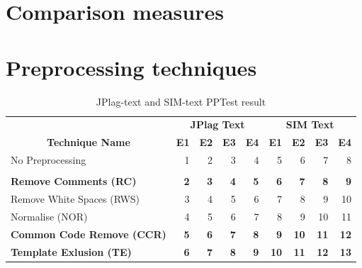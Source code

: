 \documentclass[a4paper, 12pt, oneside, openany, final, pdftex]{book}\usepackage[]{graphicx}\usepackage[]{color}
\begin{document}
\chapter{Comparison measures}\label{ch:measures}


\chapter{Preprocessing techniques}\label{ch:preporcessing}

    


\begin{table}
	\centering
	\caption{JPlag-text and SIM-text PPTest result} \label{tbl:resultsPPTestText}

\begin{tabular}{lrrrr|>{}rrrr}
\toprule
\multicolumn{1}{c}{\textbf{ }} & \multicolumn{4}{c}{\textbf{JPlag Text}} & \multicolumn{4}{c}{\textbf{SIM Text}} \\
\cmidrule(l{3pt}r{3pt}){2-5} \cmidrule(l{3pt}r{3pt}){6-9}
\multicolumn{1}{c}{\textbf{Technique Name}} & \multicolumn{1}{c}{\textbf{E1}} & \multicolumn{1}{c}{\textbf{E2}} & \multicolumn{1}{c}{\textbf{E3}} & \multicolumn{1}{c}{\textbf{E4}} & \multicolumn{1}{c}{\textbf{E1}} & \multicolumn{1}{c}{\textbf{E2}} & \multicolumn{1}{c}{\textbf{E3}} & \multicolumn{1}{c}{\textbf{E4 }}\\
\midrule
\rowcolor{gray!6}  No Preprocessing & 1 & 2 & 3 & 4 & 5 & 6 & 7 & 8\\
\addlinespace[0.3em]
\multicolumn{9}{l}{\textbf{Techniques}}\\
\textbf{\hspace{1em}Remove Comments (RC)} & \textbf{2} & \textbf{3} & \textbf{4} & \textbf{5} & \textbf{6} & \textbf{7} & \textbf{8} & \textbf{9}\\
\rowcolor{gray!6}  \hspace{1em}Remove White Spaces (RWS) & 3 & 4 & 5 & 6 & 7 & 8 & 9 & 10\\
\hspace{1em}Normalise (NOR) & 4 & 5 & 6 & 7 & 8 & 9 & 10 & 11\\
\rowcolor{gray!6}  \textbf{\hspace{1em}Common Code Remove (CCR)} & \textbf{5} & \textbf{6} & \textbf{7} & \textbf{8} & \textbf{9} & \textbf{10} & \textbf{11} & \textbf{12}\\
\textbf{\hspace{1em}Template Exlusion (TE)} & \textbf{6} & \textbf{7} & \textbf{8} & \textbf{9} & \textbf{10} & \textbf{11} & \textbf{12} & \textbf{13}\\

\end{tabular}
\end{table}
\end{document}

